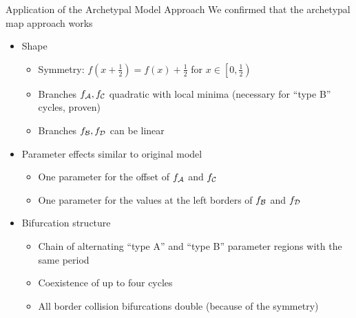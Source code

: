 \begin{frame}{Application of the Archetypal Model Approach}
	\vspace{-1em}
	We confirmed that the archetypal map approach works
	\vspace{1em}
	\pause
	\begin{itemize}
		\item Shape
		      \begin{itemize}
			      \item Symmetry: $f\left(x + \frac{1}{2}\right) = f(x) + \frac{1}{2}$ for $x \in \left[0, \frac{1}{2}\right)$
			      \item Branches $f_{\mathcal{A}}, f_{\mathcal{C}}$ quadratic with local minima (necessary for ``type B'' cycles, proven)
			      \item Branches $f_{\mathcal{B}}, f_{\mathcal{D}}$ can be linear
		      \end{itemize}
		      \pause
		\item Parameter effects similar to original model
		      \begin{itemize}
			      \item One parameter for the offset of $f_{\mathcal{A}}$ and $f_{\mathcal{C}}$
			      \item One parameter for the values at the left borders of $f_{\mathcal{B}}$ and $f_{\mathcal{D}}$
		      \end{itemize}
		      \pause
		\item Bifurcation structure
		      \begin{itemize}
			      \item Chain of alternating ``type A'' and ``type B'' parameter regions with the same period
			      \item Coexistence of up to four cycles
			      \item All border collision bifurcations double (because of the symmetry)
		      \end{itemize}
	\end{itemize}
\end{frame}
